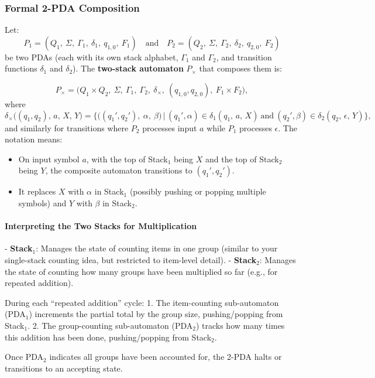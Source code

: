 \documentclass[11pt]{article}
\begin{document}
\subsubsection*{Formal 2-PDA Composition}

Let:
\[
P_1 = (Q_1,\ \Sigma,\ \Gamma_1,\ \delta_1,\ q_{1,0},\ F_1)
\quad\text{and}\quad
P_2 = (Q_2,\ \Sigma,\ \Gamma_2,\ \delta_2,\ q_{2,0},\ F_2)
\]
be two PDAs (each with its own stack alphabet, \(\Gamma_1\) and \(\Gamma_2\), and transition functions \(\delta_1\) and \(\delta_2\)). The \textbf{two-stack automaton} \(P_{\times}\) that composes them is:

\[
P_{\times} = 
\bigl(Q_1 \times Q_2,\ 
\Sigma,\ 
\Gamma_1,\ 
\Gamma_2,\ 
\delta_{\times},\ 
(q_{1,0}, q_{2,0}),\ 
F_1 \times F_2\bigr),
\]
where
\[
\delta_{\times}\bigl((q_1,q_2),\,a,\,X,\,Y\bigr) = 
\bigl\{
    \bigl((q_1',q_2'),\ \alpha,\ \beta\bigr)
    \,\big|\,
    (q_1', \alpha) \in \delta_1(q_1,\,a,\,X)\ \text{and}\ (q_2', \beta) \in \delta_2(q_2,\,\epsilon,\,Y)
\bigr\},
\]
and similarly for transitions where \(P_2\) processes input \(a\) while \(P_1\) processes \(\epsilon\). The notation means:
\begin{itemize}
    \item On input symbol \(a\), with the top of Stack$_1$ being \(X\) and the top of Stack$_2$ being \(Y\), the composite automaton transitions to \((q_1',q_2')\).
    \item It replaces \(X\) with \(\alpha\) in Stack$_1$ (possibly pushing or popping multiple symbols) and \(Y\) with \(\beta\) in Stack$_2$.
\end{itemize}

\paragraph{Interpreting the Two Stacks for Multiplication}
- \textbf{Stack$_1$}: Manages the state of counting items in one group (similar to your single-stack counting idea, but restricted to item-level detail).  
- \textbf{Stack$_2$}: Manages the state of counting how many groups have been multiplied so far (e.g., for repeated addition).

During each “repeated addition” cycle:
1. The item-counting sub-automaton (PDA$_1$) increments the partial total by the group size, pushing/popping from Stack$_1$.
2. The group-counting sub-automaton (PDA$_2$) tracks how many times this addition has been done, pushing/popping from Stack$_2$.

Once PDA$_2$ indicates all groups have been accounted for, the 2-PDA halts or transitions to an accepting state.
\end{document}
